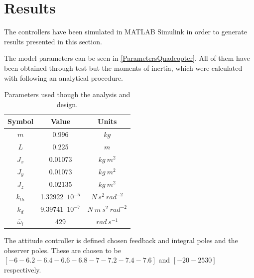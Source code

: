 \section{Results}

The controllers have been simulated in MATLAB Simulink in order to generate results presented in this section. 

The model parameters can be seen in \autoref{ParametersQuadcopter}. All of them have been obtained through test but the moments of inertia, which were calculated with following an analytical procedure.

\begin{table}[H]
    \centering
    \begin{tabular}{c|c|c}
        \textbf{Symbol} &\textbf{Value} &\textbf{Units}\\
        \hline %
        $m$ & 0.996       &$kg$\\
        \hline %
        $L$  &   0.225       & $m$\\
        \hline %
        $J_x$  & 0.01073       & $kg \  m^2$\\
        \hline %
        $J_y$  & 0.01073       & $kg \  m^2$\\
        \hline %
        $J_z$  & 0.02135       & $kg \  m^2$\\
        \hline %
        $k_{th}$  & 1.32922\ $10^{-5}$       & $N \  s^2 \  rad^{-2}$\\
        \hline %
        $k_{d}$  & 9.39741\ $10^{-7}$       & $N \  m \  s^2 \  rad^{-2}$\\
        \hline %
        $\overline{\omega}_i$& 429      & $rad \ s^{-1}$\\
        
    \end{tabular}
    \caption{Parameters used though the analysis and design.}

    \label{ParametersQuadcopter}
\end{table}
The attitude controller is defined chosen feedback and integral poles and the observer poles. These are chosen to be $[-6 -6.2 -6.4 -6.6 -6.8 -7 -7.2 -7.4 -7.6]$ and $[-20 -25 30]$ respectively.


